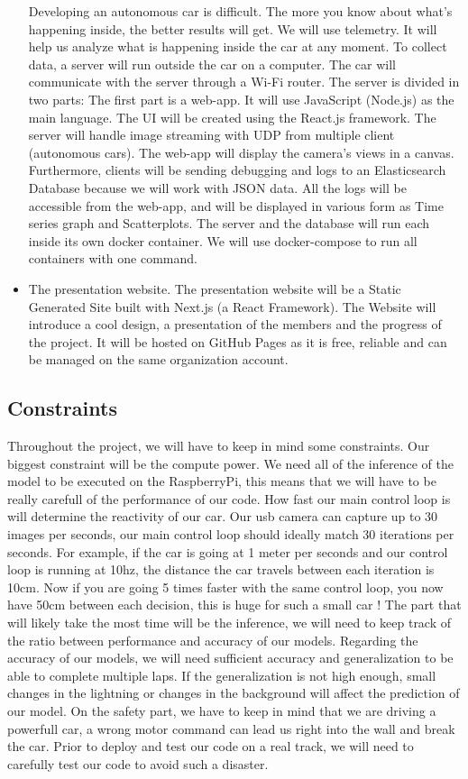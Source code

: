 \documentclass[12pt]{article}
\begin{document}
\begin{itemize}
Developing an autonomous car is difficult. The more you know about what’s happening inside, the better results will get. We will use telemetry. It will help us analyze what is happening inside the car at any moment. To collect data, a server will run outside the car on a computer. The car will communicate with the server through a Wi-Fi router. The server is divided in two parts: The first part is a web-app. It will use JavaScript (Node.js) as the main language. The UI will be created using the React.js framework. The server will handle image streaming with UDP from multiple client (autonomous cars). The web-app will display the camera’s views in a canvas. Furthermore, clients will be sending debugging and logs to an Elasticsearch Database because we will work with JSON data. All the logs will be accessible from the web-app, and will be displayed in various form as Time series graph and Scatterplots. The server and the database will run each inside its own docker container. We will use docker-compose to run all containers with one command.

\item The presentation website. The presentation website will be a Static Generated Site built with Next.js (a React Framework). The Website will introduce a cool design, a presentation of the members and the progress of the project. It will be hosted on GitHub Pages as it is free, reliable and can be managed on the same organization account.
\end{itemize}

\newpage
\subsection{Constraints}
Throughout the project, we will have to keep in mind some constraints.
Our biggest constraint will be the compute power. We need all of the inference of the model to be executed on the RaspberryPi, this means that we will have to be really carefull of the performance of our code. How fast our main control loop is will determine the reactivity of our car. Our usb camera can capture up to 30 images per seconds, our main control loop should ideally match 30 iterations per seconds. For example, if the car is going at 1 meter per seconds and our control loop is running at 10hz, the distance the car travels between each iteration is 10cm. Now if you are going 5 times faster with the same control loop, you now have 50cm between each decision, this is huge for such a small car ! The part that will likely take the most time will be the inference, we will need to keep track of the ratio between performance and accuracy of our models.
Regarding the accuracy of our models, we will need sufficient accuracy and generalization to be able to complete multiple laps. If the generalization is not high enough, small changes in the lightning or changes in the background will affect the prediction of our model.
On the safety part, we have to keep in mind that we are driving a powerfull car, a wrong motor command can lead us right into the wall and break the car. Prior to deploy and test our code on a real track, we will need to carefully test our code to avoid such a disaster.
\end{document}

